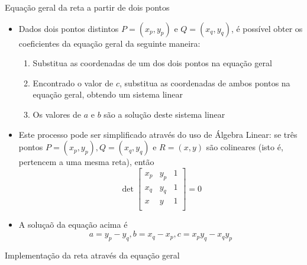 \begin{frame}[fragile]{Equação geral da reta a partir de dois pontos}

    \begin{itemize}
        \item Dados dois pontos distintos $P = (x_p, y_p)$ e $Q = (x_q, y_q)$, é possível obter os 
        coeficientes da equação geral da seguinte maneira:
        \pause

        \begin{enumerate}
            \item Substitua as coordenadas de um dos dois pontos na equação geral
        \pause
            \item Encontrado o valor de $c$, substitua as coordenadas de ambos pontos na equação
            geral, obtendo um sistema linear
        \pause
            \item Os valores de $a$ e $b$ são a solução deste sistema linear
        \end{enumerate}
        \pause

        \item Este processo pode ser simplificado através do uso de Álgebra Linear: se três pontos 
        $P = (x_p, y_p), Q = (x_q, y_q)$ e $R = (x, y)$ são colineares 
        (isto é, pertencem a uma mesma reta), então
        \[
            \det \begin{bmatrix}
                x_p & y_p  & 1 \\
                x_q & y_q  & 1 \\
                x & y  & 1 \\
            \end{bmatrix} = 0
        \]
        \pause

        \item A soluçaõ da equação acima é
        \[
            a = y_p - y_q, b = x_q - x_p, c = x_py_q - x_qy_p
        \]
    \end{itemize}
\end{frame}

\begin{frame}[fragile]{Implementação da reta através da equação geral}
\end{frame}

